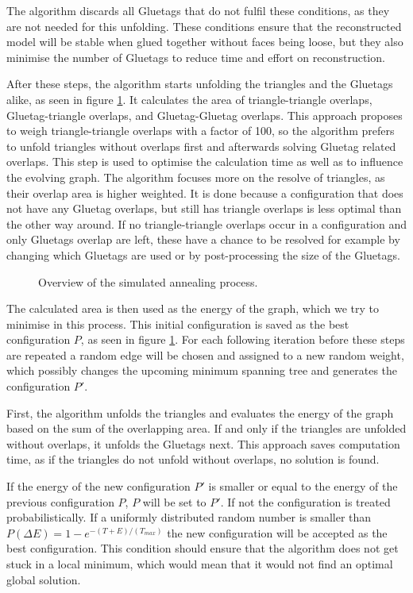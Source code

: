 \documentclass[draft,final]{vutinfth} %
\begin{document}
The algorithm discards all Gluetags that do not fulfil these conditions, as they are not needed for this unfolding. These conditions ensure that the reconstructed model will be stable when glued together without faces being loose, but they also minimise the number of Gluetags to reduce time and effort on reconstruction.

After these steps, the algorithm starts unfolding the triangles and the Gluetags alike, as seen in figure \ref{fig:concept}. It calculates the area of triangle-triangle overlaps, Gluetag-triangle overlaps, and Gluetag-Gluetag overlaps. This approach proposes to weigh triangle-triangle overlaps with a factor of 100, so the algorithm prefers to unfold triangles without overlaps first and afterwards solving Gluetag related overlaps. This step is used to optimise the calculation time as well as to influence the evolving graph. The algorithm focuses more on the resolve of triangles, as their overlap area is higher weighted. It is done because a configuration that does not have any Gluetag overlaps, but still has triangle overlaps is less optimal than the other way around. If no triangle-triangle overlaps occur in a configuration and only Gluetags overlap are left, these have a chance to be resolved for example by changing which Gluetags are used or by post-processing the size of the Gluetags.

\begin{figure}

\caption{Overview of the simulated annealing process.}
\label{fig:concept}
\end{figure}

The calculated area is then used as the energy of the graph, which we try to minimise in this process. This initial configuration is saved as the best configuration $P$, as seen in figure \ref{fig:concept}. For each following iteration before these steps are repeated a random edge will be chosen and assigned to a new random weight, which possibly changes the upcoming minimum spanning tree and generates the configuration $P'$.

First, the algorithm unfolds the triangles and evaluates the energy of the graph based on the sum of the overlapping area. If and only if the triangles are unfolded without overlaps, it unfolds the Gluetags next. This approach saves computation time, as if the triangles do not unfold without overlaps, no solution is found.

If the energy of the new configuration $P'$ is smaller or equal to the energy of the previous configuration $P$, $P$ will be set to $P'$. If not the configuration is treated probabilistically. If a uniformly distributed random number is smaller than $P(\Delta E) = 1 - e^{-(T + E)/(T_{max})}$ the new configuration will be accepted as the best configuration. This condition should ensure that the algorithm does not get stuck in a local minimum, which would mean that it would not find an optimal global solution.
\end{document}
